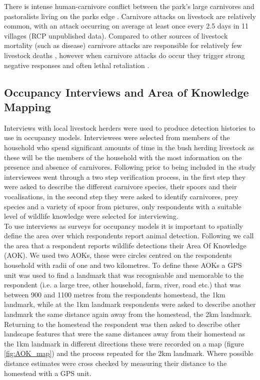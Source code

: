 There is intense human-carnivore conflict between the park's large carnivores and pastoralists living on the parks edge \cite{dickman2008}. Carnivore attacks on livestock are relatively common, with an attack occurring on average at least once every 2.5 days in 11 villages (RCP unpublished data). Compared to other sources of livestock mortality (such as disease) carnivore attacks are responsible for relatively few livestock deaths \cite{Dickman_2014}, however when carnivore attacks do occur they trigger strong negative responses and often lethal retaliation \cite{Abade2014,Dickman2008}. 

\subsection{Occupancy Interviews and Area of Knowledge Mapping}

Interviews with local livestock herders were used to produce detection histories to use in occupancy models. Interviewees were selected from members of the household who spend significant amounts of time in the bush herding livestock as these will be the members of the household with the most information on the presence and absence of carnivores. Following \citet{Zeller_2011} prior to being included in the study interviewees went through a two step verification process, in the first step they were asked to describe the different carnivore species, their spoors and their vocalisations, in the second step they were asked to identify carnivores, prey species and a variety of spoor from pictures, only respondents with a suitable level of wildlife knowledge were selected for interviewing.\\

To use interviews as surveys for occupancy models it is important to spatially define the area over which respondents report animal detection. Following \cite{Zeller_2011} we call the area that a respondent reports wildlife detections their Area Of Knowledge (AOK). We used two AOKs, these were circles centred on the respondents household with radii of one and two kilometres. To define these AOKs a GPS unit was used to find a landmark that was recognisable and memorable to the respondent (i.e. a large tree, other household, farm, river, road etc.) that was between 900 and 1100 metres from the respondents homestead, the 1km landmark, while at the 1km landmark respondents were asked to describe another landmark the same distance again away from the homestead, the 2km landmark. Returning to the homestead the respondent was then asked to describe other landscape features that were the same distances away from their homestead as the 1km landmark in different directions these were recorded on a map (figure \ref{fig:AOK_map}) and the process repeated for the 2km landmark. Where possible distance estimates were cross checked by measuring their distance to the homestead with a GPS unit.\\

